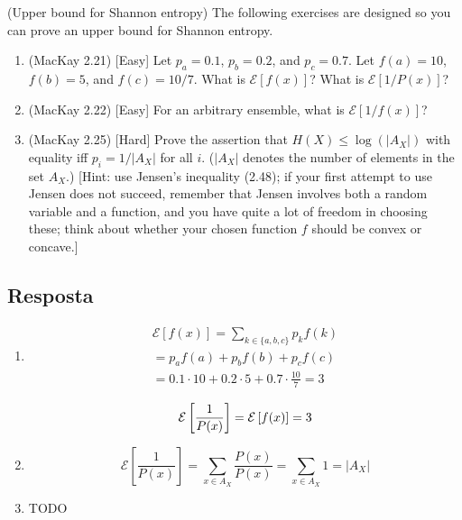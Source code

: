 (Upper bound for Shannon entropy) The following exercises are designed so you can prove an upper bound for Shannon entropy.

\begin{enumerate}
	\item (MacKay 2.21) [Easy] Let $p_a = 0.1$, $p_b = 0.2$, and $p_c = 0.7$. Let $f(a) = 10$, $f(b) = 5$, and $f(c) = 10/7$. What is $\mathcal{E}[f(x)]$? What is $\mathcal{E}[1/P(x)]$?
	
	\item (MacKay 2.22) [Easy] For an arbitrary ensemble, what is $\mathcal{E}[1/f(x)]$?
	
	\item (MacKay 2.25) [Hard] Prove the assertion that $H(X) \le \log(|A_X|)$ with equality iff $p_i = 1/|A_X|$ for all $i$. ($|A_X|$ denotes the number of elements in the set $A_X$.) [Hint: use Jensen's inequality (2.48); if your first attempt to use Jensen does not succeed, remember that Jensen involves both a random variable and a function, and you have quite a lot of freedom in choosing these; think about whether your chosen function $f$ should be convex or concave.]
	
\end{enumerate}

\subsection*{Resposta}

\begin{enumerate}
    \item
    \[\begin{array}{l}
    \displaystyle \mathcal{E}[f(x)] = \sum\limits_{k \in \{ a,b,c\} } {{p_k}f(k)} \\
    \displaystyle = {p_a}f(a) + {p_b}f(b) + {p_c}f(c)\\
    \displaystyle = 0.1 \cdot 10 + 0.2 \cdot 5 + 0.7 \cdot \frac{{10}}{7} = 3
    \end{array}\]
    
    \[{\cal E}\left[ {\frac{1}{{P(x)}}} \right] = {\cal E}\left[ {f(x)} \right] = 3\]
    
    \item
    \[\mathcal{E} \left[ {\frac{1}{{P(x)}}} \right] = \sum\limits_{x \in {A_X}} {\frac{P(x)}{{P(x)}}}  = \sum\limits_{x \in {A_X}} 1  = |{A_X}|\]
    
    \item
    TODO

\end{enumerate}

